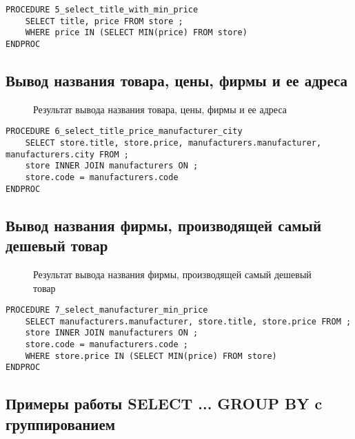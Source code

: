 \begin{lstlisting}[float,caption=Source code]
PROCEDURE 5_select_title_with_min_price
	SELECT title, price FROM store ;
	WHERE price IN (SELECT MIN(price) FROM store)
ENDPROC
\end{lstlisting}

\subsection{Вывод названия товара, цены, фирмы и ее адреса}

\begin{figure}[h!t]
  \caption{Результат вывода названия товара, цены, фирмы и ее адреса}
\end{figure}

\begin{lstlisting}[float,caption=Source code]
PROCEDURE 6_select_title_price_manufacturer_city
	SELECT store.title, store.price, manufacturers.manufacturer, manufacturers.city FROM ;
	store INNER JOIN manufacturers ON ;
	store.code = manufacturers.code 
ENDPROC
\end{lstlisting}

\subsection{Вывод названия фирмы, производящей самый дешевый товар}

\begin{figure}[h!t]
  \caption{Результат вывода названия фирмы, производящей самый дешевый товар}
\end{figure}

\begin{lstlisting}[float,caption=Source code]
PROCEDURE 7_select_manufacturer_min_price
	SELECT manufacturers.manufacturer, store.title, store.price FROM ;
	store INNER JOIN manufacturers ON ;
	store.code = manufacturers.code ;
	WHERE store.price IN (SELECT MIN(price) FROM store)
ENDPROC
\end{lstlisting}

\subsection{Примеры работы SELECT ... GROUP BY c группированием}

